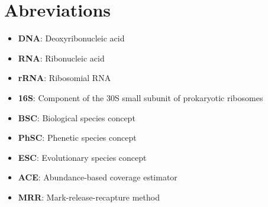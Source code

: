 \logvartrue
\chapter{Abreviations}

\begin{itemize}
\item \textbf{DNA}: Deoxyribonucleic acid
\item \textbf{RNA}: Ribonucleic acid
\item \textbf{rRNA}: Ribosomial RNA
\item \textbf{16S}: Component of the 30S small subunit of prokaryotic ribosomes
\item \textbf{BSC}: Biological species concept
\item \textbf{PhSC}: Phenetic species concept
\item \textbf{ESC}: Evolutionary species concept
\item \textbf{ACE}: Abundance-based coverage estimator
\item \textbf{MRR}: Mark-release-recapture method


\end{itemize}
